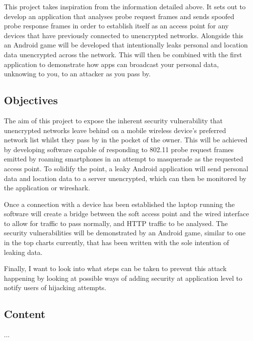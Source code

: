This project takes inspiration from the information detailed above. It sets out to develop an application that analyses probe request frames and sends spoofed probe response frames in order to establish itself as an access point for any devices that have previously connected to unencrypted networks. Alongside this an Android game will be developed that intentionally leaks personal and location data unencrypted across the network. This will then be combined with the first application to demonstrate how apps can broadcast your personal data, unknowing to you, to an attacker as you pass by.

\subsection{Objectives}
The aim of this project to expose the inherent security vulnerability that unencrypted networks leave behind on a mobile wireless device's preferred network list whilst they pass by in the pocket of the owner. This will be achieved by developing software capable of responding to 802.11 probe request frames emitted by roaming smartphones in an attempt to masquerade as the requested access point. To solidify the point, a leaky Android application will send personal data and location data to a server unencrypted, which can then be monitored by the application or wireshark.

Once a connection with a device has been established the laptop running the software will create a bridge between the soft access point and the wired interface to allow for traffic to pass normally, and HTTP traffic to be analysed. The security vulnerabilities will be demonstrated by an Android game, similar to one in the top charts currently, that has been written with the sole intention of leaking data. 

Finally, I want to look into what steps can be taken to prevent this attack happening by looking at possible ways of adding security at application level to notify users of hijacking attempts.

\subsection{Content}
...
\clearpage